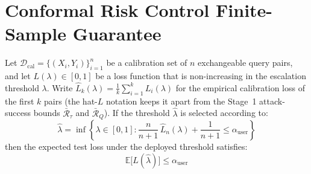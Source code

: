 \section{Conformal Risk Control Finite-Sample Guarantee}
\label{app:proof_conformal}

\begin{theorem}
Let $\mathcal{D}_{\mathrm{cal}} = \{(X_i, Y_i)\}_{i=1}^n$ be a calibration set of $n$ exchangeable query pairs, and let $L(\lambda) \in [0, 1]$ be a loss function that is non-increasing in the escalation threshold $\lambda$. Write $\hat{L}_k(\lambda) = \frac{1}{k}\sum_{i=1}^{k} L_i(\lambda)$ for the empirical calibration loss of the first $k$ pairs (the hat-$L$ notation keeps it apart from the Stage~1 attack-success bounds $\bar{\mathcal{R}}_\tau$ and $\bar{\mathcal{R}}_Q$). If the threshold $\hat{\lambda}$ is selected according to:
\begin{equation}
    \hat{\lambda} = \inf\left\{ \lambda \in [0, 1] : \frac{n}{n+1}\,\hat{L}_n(\lambda) + \frac{1}{n+1} \le \alpha_{\mathrm{user}} \right\}
\end{equation}
then the expected test loss under the deployed threshold satisfies:
\begin{equation}
    \mathbb{E}\big[L(\hat{\lambda})\big] \le \alpha_{\mathrm{user}}
\end{equation}
\end{theorem}


